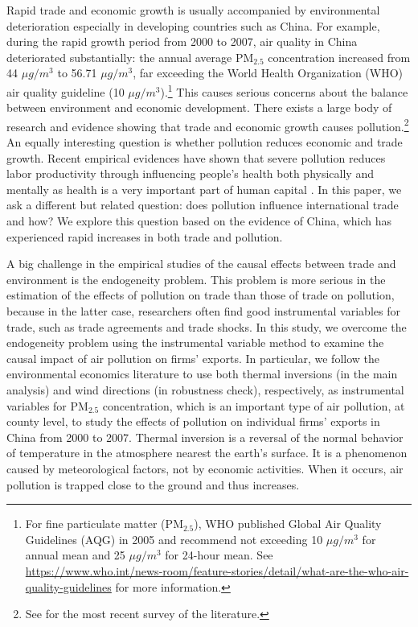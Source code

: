 \documentclass[12pt]{article}
\begin{document}
\label{sec:1} Rapid trade and economic growth is usually accompanied by
environmental deterioration especially in developing countries such as
China. For example, during the rapid growth period from 2000 to 2007, air quality in China deteriorated substantially:
 the annual average $\mathrm{PM_{2.5}}$
concentration increased from 44 $\mu g/m^{3}$ to 56.71 $\mu g/m^{3}$, far exceeding the World Health Organization
(WHO) air quality
guideline (10 $\mu g/m^{3}$).\footnote{%
For fine particulate matter ($\mathrm{PM_{2.5}}$), WHO published Global Air Quality Guidelines (AQG) in 2005 and recommend not exceeding 10 $\mu g/m^{3}$ for annual mean and 25 $\mu g/m^{3}$ for 24-hour mean.
See %
\url{https://www.who.int/news-room/feature-stories/detail/what-are-the-who-air-quality-guidelines}
for more information.} This causes serious
concerns about the balance between environment and economic development. There exists
a large body of research and evidence showing that trade and economic growth causes
pollution.\footnote{%
See \cite{cherniwchan2017trade} for the most recent survey of the literature.%
} An equally interesting question is whether pollution reduces economic and
trade growth. Recent empirical evidences have shown that severe pollution
reduces labor productivity through influencing people's health both
physically and mentally as health is a very important part of human capital %
\citep{graff2012impact,chang2016particulate,zhang2018impact,fu2021air,somanathan2021impact,adhvaryu2022management}%
. In this paper, we ask a different but related question: does pollution
influence international trade and how? We explore this question based on the
evidence of China, which has experienced rapid increases in both trade and
pollution.

A big challenge in the empirical studies of the causal effects between trade
and environment is the endogeneity problem. This problem is more serious in
the estimation of the effects of pollution on trade than those of trade on
pollution, because in the latter case, researchers often find good
instrumental variables for trade, such as trade agreements and trade shocks.
In this study, we overcome the endogeneity problem using the instrumental
variable method to examine the causal impact of air pollution on firms'
exports. In particular, we follow the environmental economics literature 
\citep{fu2021air,
fu2021trans,NBERw28401,chen2022effect} to use both thermal inversions (in
the main analysis) and wind directions (in robustness check), respectively,
as instrumental variables for $\mathrm{PM_{2.5}}$ concentration, which is an
important type of air pollution, at county level, to study the effects of
pollution on individual firms' exports in China from 2000 to 2007. Thermal
inversion is a reversal of the normal behavior of temperature in the
atmosphere nearest the earth's surface. It is a phenomenon caused by
meteorological factors, not by economic activities. When it occurs, air
pollution is trapped close to the ground and thus increases.
\end{document}

